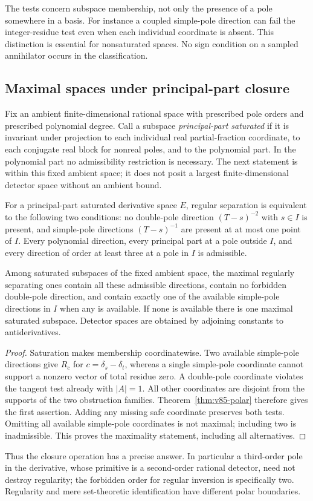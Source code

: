 The tests concern subspace membership, not only the presence of a
pole somewhere in a basis. For instance a coupled simple-pole direction
can fail the integer-residue test even when each individual coordinate
is absent. This distinction is essential for nonsaturated spaces.
No sign condition on a sampled annihilator occurs in the classification.

\subsection{Maximal spaces under principal-part closure}
Fix an ambient finite-dimensional rational space with prescribed pole
orders and prescribed polynomial degree. Call a subspace
\emph{principal-part saturated} if it is invariant under projection to
each individual real partial-fraction coordinate, to each conjugate
real block for nonreal poles, and to the polynomial part. In the
polynomial part no admissibility restriction is necessary. The next
statement is within this fixed ambient space; it does not posit a
largest finite-dimensional detector space without an ambient bound.

\begin{corollary}
\label{cor:v85-maximal}
For a principal-part saturated derivative space $E$, regular separation
is equivalent to the following two conditions: no double-pole direction
$(T-s)^{-2}$ with $s\in I$ is present, and simple-pole directions
$(T-s)^{-1}$ are present at at most one point of $I$.
Every polynomial direction, every principal part at a pole outside
$I$, and every direction of order at least three at a pole in $I$
is admissible.

Among saturated subspaces of the fixed ambient space, the maximal
regularly separating ones contain all these admissible directions,
contain no forbidden double-pole direction, and contain exactly one
of the available simple-pole directions in $I$ when any is available.
If none is available there is one maximal saturated subspace. Detector
spaces are obtained by adjoining constants to antiderivatives.
\end{corollary}
\begin{proof}
Saturation makes membership coordinatewise. Two available simple-pole
directions give $R_c$ for $c=\delta_s-\delta_t$, whereas a single
simple-pole coordinate cannot support a nonzero vector of total
residue zero. A double-pole coordinate violates the tangent test
already with $|A|=1$. All other coordinates are disjoint from the
supports of the two obstruction families. Theorem~\ref{thm:v85-polar}
therefore gives the first assertion. Adding any missing safe coordinate
preserves both tests. Omitting all available simple-pole coordinates
is not maximal; including two is inadmissible. This proves the
maximality statement, including all alternatives.
\end{proof}
Thus the closure operation has a precise answer. In particular a
third-order pole in the derivative, whose primitive is a second-order
rational detector, need not destroy regularity; the forbidden order
for regular inversion is specifically two. Regularity and mere
set-theoretic identification have different polar boundaries.

